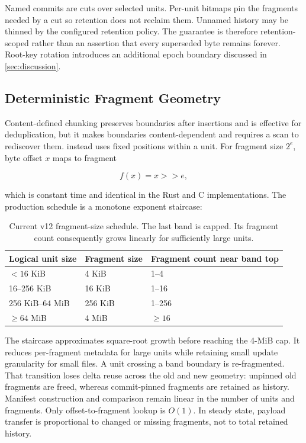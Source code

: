 Named commits are cuts over selected units.  Per-unit bitmaps pin the fragments
needed by a cut so retention does not reclaim them.  Unnamed history may be
thinned by the configured retention policy.  The guarantee is therefore
retention-scoped rather than an assertion that every superseded byte remains
forever.  Root-key rotation introduces an additional epoch boundary discussed in
\cref{sec:discussion}.

\subsection{Deterministic Fragment Geometry}
\label{subsec:chunking}

Content-defined chunking preserves boundaries after insertions and is effective
for deduplication, but it makes boundaries content-dependent and requires a
scan to rediscover them.  \sfs{} instead uses fixed positions within a unit.
For fragment size $2^e$, byte offset $x$ maps to fragment

\begin{equation}
  f(x) = x \mathbin{\mathtt{>>}} e,
\end{equation}

which is constant time and identical in the Rust and C implementations.  The
production schedule is a monotone exponent staircase:

\begin{table}[t]
  \centering
  \small
  \caption{Current v12 fragment-size schedule.  The last band is capped.  Its
    fragment count consequently grows linearly for sufficiently large units.}
  \label{tab:geometry}
  \begin{tabular}{@{}lll@{}}
    \toprule
    Logical unit size & Fragment size & Fragment count near band top \\
    \midrule
    $<16$ KiB & 4 KiB & 1--4 \\
    16--256 KiB & 16 KiB & 1--16 \\
    256 KiB--64 MiB & 256 KiB & 1--256 \\
    $\geq64$ MiB & 4 MiB & $\geq16$ \\
    \bottomrule
  \end{tabular}
\end{table}

The staircase approximates square-root growth before reaching the 4-MiB cap.
It reduces per-fragment metadata for large units while retaining small update
granularity for small files.  A unit crossing a band boundary is re-fragmented.
That transition loses delta reuse across the old and new geometry: unpinned old
fragments are freed, whereas commit-pinned fragments are retained as history.
Manifest construction and comparison remain linear in the number of units and
fragments.  Only offset-to-fragment lookup is $O(1)$.  In steady state, payload
transfer is proportional to changed or missing fragments, not to total retained
history.

